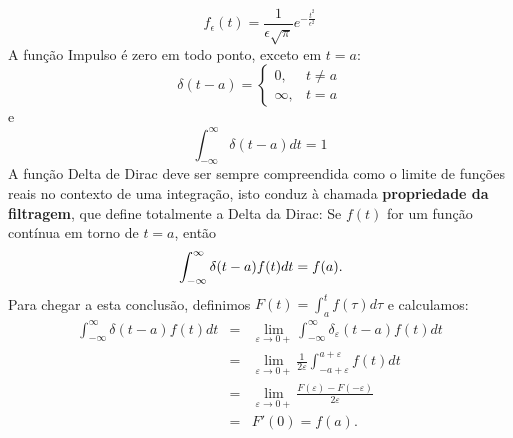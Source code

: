 \documentclass[a4paper,10pt]{book}
\begin{document}
 \begin{equation}
 f_\epsilon(t)=\frac{1}{\epsilon\sqrt{\pi}}e^{-\frac{t^2}{\epsilon^2}}
 \end{equation}
% 
% 
% 
 A função Impulso é zero em todo ponto, exceto em $t=a$:
 \begin{equation}
 \delta(t-a)=\left\{\begin{array}{ll}0,&t\neq a\\\infty,&t=a  \end{array}\right.
 \end{equation}
 e
 \begin{equation}
 \int_{-\infty}^\infty\delta(t-a)dt=1
 \end{equation}
 A função Delta de Dirac deve ser sempre compreendida como o limite de funções reais no contexto de uma integração, isto conduz à chamada  {\bf propriedade da filtragem}, que define totalmente a Delta da Dirac:
 Se $f(t)$ for um função contínua em torno de $t=a$, então
 \begin{equation}{\label{prop_filtragem_dirac}}
 \int_{-\infty}^\infty \delta(t-a)f(t)dt=f(a). 
 \end{equation}
 Para chegar a esta conclusão, definimos $F(t)=\int_a^t f(\tau)d\tau$ e calculamos:
 \begin{eqnarray*}
 \int_{-\infty}^\infty \delta(t-a)f(t)dt&=&\lim_{\varepsilon\to 0+}
 \int_{-\infty}^\infty \delta_\varepsilon(t-a)f(t)dt\\
 &=&\lim_{\varepsilon\to 0+}\frac{1}{2\varepsilon}\int_{-a+\varepsilon}^{a+\varepsilon} f(t)dt\\
 &=&\lim_{\varepsilon\to 0+}\frac{F(\varepsilon)-F(-\varepsilon)}{2\varepsilon}\\
 &=&F'(0)=f(a).
 \end{eqnarray*}
\end{document}
